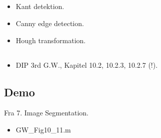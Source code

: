 \subsection{\subtopics}

\begin{itemize}
	\item Kant detektion.
	\item Canny edge detection.
	\item Hough transformation.
\end{itemize}

\subsection{\curriculum}

\begin{itemize}
	\item DIP 3rd G.W., Kapitel 10.2, 10.2.3, 10.2.7 (!).
\end{itemize}

\subsection{Demo}

Fra 7. Image Segmentation.

\begin{itemize}
	\item GW\_Fig10\_11.m
\end{itemize}
